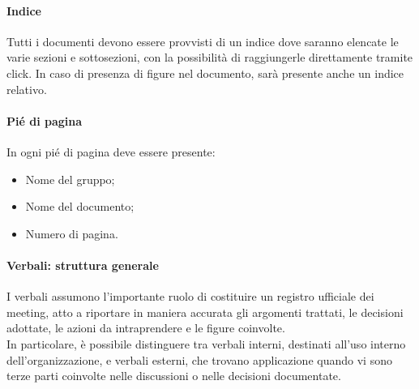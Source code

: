 \paragraph{Indice}
Tutti i documenti devono essere provvisti di un indice dove saranno elencate le varie sezioni e sottosezioni, con la possibilità di raggiungerle direttamente tramite click.
In caso di presenza di figure nel documento, sarà presente anche un indice relativo.

\paragraph{Pié di pagina}
In ogni pié di pagina deve essere presente:
\begin{itemize}
    \item Nome del gruppo;
    \item Nome del documento;
    \item Numero di pagina.
\end{itemize}

\paragraph{Verbali: struttura generale}
\label{sec:Verbali}
I verbali assumono l'importante ruolo di costituire un registro ufficiale dei meeting, atto a riportare in maniera accurata gli argomenti trattati, le decisioni adottate, le azioni da intraprendere e le figure coinvolte.\\
In particolare, è possibile distinguere tra verbali interni, destinati all'uso interno dell'organizzazione, e verbali esterni, che trovano applicazione quando vi sono terze parti coinvolte nelle discussioni o nelle decisioni documentate.\\

